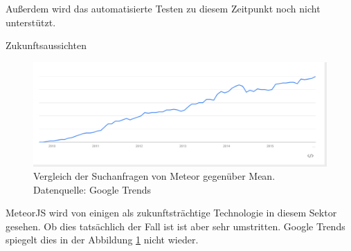 Außerdem wird das automatisierte Testen zu diesem Zeitpunkt noch nicht unterstützt.

Zukunftsaussichten

\begin{figure}[h]
	\centering
	\includegraphics[width=0.7\linewidth]{figures/NodeJS.png}
	\caption{Vergleich der Suchanfragen von Meteor gegenüber Mean. Datenquelle: Google Trends \cite{googleTrends:meteorVsMean}}
	\label{f:mean-frameworks:meteorVsMean}
\end{figure}

MeteorJS wird von einigen als zukunftsträchtige Technologie in diesem Sektor gesehen.
Ob dies tatsächlich der Fall ist ist aber sehr umstritten.
Google Trends spiegelt dies in der Abbildung \ref{f:mean-frameworks:meteorVsMean} nicht wieder.
